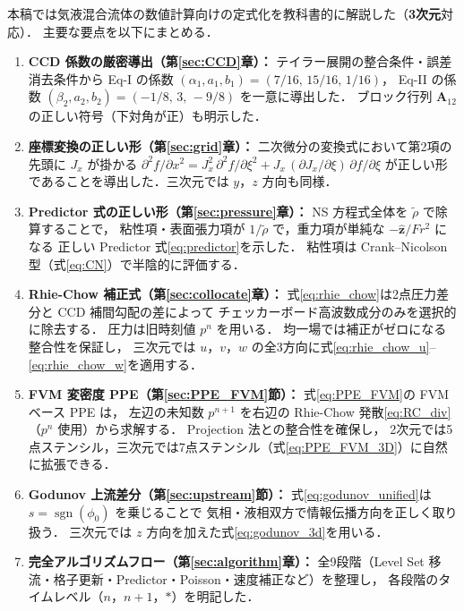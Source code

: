 \documentclass[12pt, a4paper, titlepage]{article}
\newcommand{\jp}[1]{{\normalfont\jpfont #1}}
\begin{document}
\jp{本稿では気液混合流体の数値計算向けの定式化を教科書的に解説した（\textbf{3次元}対応）．
主要な要点を以下にまとめる．}

\begin{enumerate}[leftmargin=2em, itemsep=4pt]

  \item \jp{\textbf{CCD 係数の厳密導出（第\ref{sec:CCD}章）：}
        テイラー展開の整合条件・誤差消去条件から Eq-I の係数
        $(\alpha_1,a_1,b_1)=(7/16,\,15/16,\,1/16)$，
        Eq-II の係数 $(\beta_2,a_2,b_2)=(-1/8,\,3,\,-9/8)$ を一意に導出した．
        ブロック行列 $\bm{A}_{12}$ の正しい符号（下対角が正）も明示した．}

  \item \jp{\textbf{座標変換の正しい形（第\ref{sec:grid}章）：}
        二次微分の変換式において第2項の先頭に $J_x$ が掛かる
        $\partial^2 f/\partial x^2 = J_x^2\,\partial^2 f/\partial\xi^2
        + J_x\,(\partial J_x/\partial\xi)\,\partial f/\partial\xi$
        が正しい形であることを導出した．三次元では $y$，$z$ 方向も同様．}

  \item \jp{\textbf{Predictor 式の正しい形（第\ref{sec:pressure}章）：}
        NS 方程式全体を $\tilde\rho$ で除算することで，
        粘性項・表面張力項が $1/\tilde\rho$ で，重力項が単純な $-\hat{\bm{z}}/Fr^2$ になる
        正しい Predictor 式\eqref{eq:predictor}を示した．
        粘性項は Crank--Nicolson 型（式\eqref{eq:CN}）で半陰的に評価する．}

  \item \jp{\textbf{Rhie-Chow 補正式（第\ref{sec:collocate}章）：}
        式\eqref{eq:rhie_chow}は2点圧力差分と CCD 補間勾配の差によって
        チェッカーボード高波数成分のみを選択的に除去する．
        圧力は旧時刻値 $p^n$ を用いる．
        均一場では補正がゼロになる整合性を保証し，
        三次元では $u$，$v$，$w$ の全3方向に式\eqref{eq:rhie_chow_u}--\eqref{eq:rhie_chow_w}を適用する．}

  \item \jp{\textbf{FVM 変密度 PPE（第\ref{sec:PPE_FVM}節）：}
        式\eqref{eq:PPE_FVM}の FVM ベース PPE は，
        左辺の未知数 $p^{n+1}$ を右辺の Rhie-Chow 発散\eqref{eq:RC_div}（$p^n$ 使用）から求解する．
        Projection 法との整合性を確保し，
        2次元では5点ステンシル，三次元では7点ステンシル（式\eqref{eq:PPE_FVM_3D}）に自然に拡張できる．}

  \item \jp{\textbf{Godunov 上流差分（第\ref{sec:upstream}節）：}
        式\eqref{eq:godunov_unified}は $s=\operatorname{sgn}(\phi_0)$ を乗じることで
        気相・液相双方で情報伝播方向を正しく取り扱う．
        三次元では $z$ 方向を加えた式\eqref{eq:godunov_3d}を用いる．}

  \item \jp{\textbf{完全アルゴリズムフロー（第\ref{sec:algorithm}章）：}
        全9段階（Level Set 移流・格子更新・Predictor・Poisson・速度補正など）を整理し，
        各段階のタイムレベル（$n$，$n+1$，$*$）を明記した．}

\end{enumerate}
\end{document}

